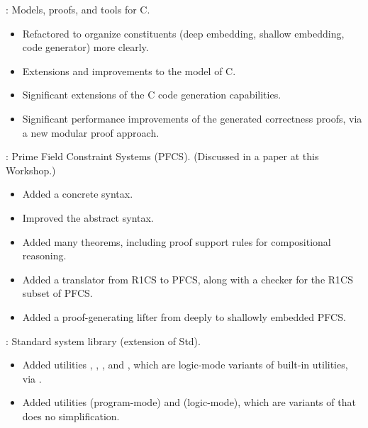 
\begin{frame}

\implibtitle

:
Models, proofs, and tools for C.
\begin{itemize}
\item Refactored to organize constituents
      (deep embedding, shallow embedding, code generator)
      more clearly.
\item Extensions and improvements to the model of C.
\item Significant extensions of the C code generation capabilities.
\item Significant performance improvements of the generated correctness proofs,
      via a new modular proof approach.
\end{itemize}

\end{frame}


\begin{frame}

\implibtitle

:
Prime Field Constraint Systems (PFCS).
(Discussed in a paper at this Workshop.)
\begin{itemize}
\item Added a concrete syntax.
\item Improved the abstract syntax.
\item Added many theorems,
      including proof support rules for compositional reasoning.
\item Added a translator from R1CS to PFCS,
      along with a checker for the R1CS subset of PFCS.
\item Added a proof-generating lifter from deeply to shallowly embedded PFCS.
\end{itemize}

\end{frame}


\begin{frame}

\implibtitle

:
Standard system library (extension of Std).
\begin{itemize}
\item Added utilities
      ,
      ,
      , and
      ,
      which are logic-mode variants of built-in utilities,
      via .
\item Added utilities
       (program-mode) and
       (logic-mode),
      which are variants of  that does no simplification.
\end{itemize}

\end{frame}

